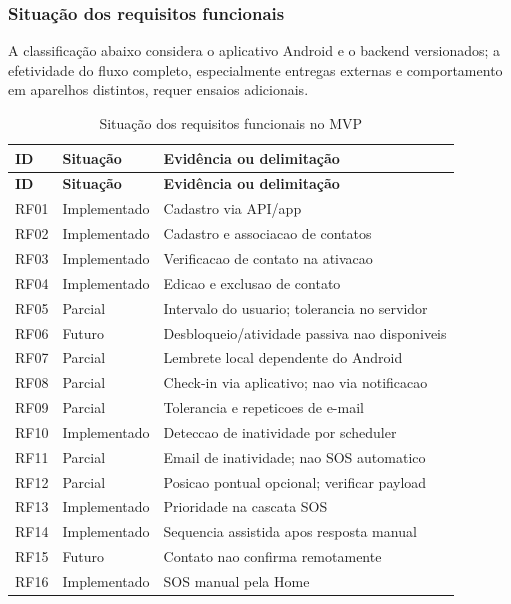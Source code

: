 \subsubsection{Situação dos requisitos funcionais}

A classificação abaixo considera o aplicativo Android e o backend versionados; a efetividade do fluxo completo, especialmente entregas externas e comportamento em aparelhos distintos, requer ensaios adicionais.

\begin{longtable}{p{1.25cm}p{2.2cm}p{10.0cm}}
\caption{Situação dos requisitos funcionais no MVP}\label{tab_status_rf}\\
\hline
\textbf{ID} & \textbf{Situação} & \textbf{Evidência ou delimitação} \\
\hline
\endfirsthead
\hline
\textbf{ID} & \textbf{Situação} & \textbf{Evidência ou delimitação} \\
\hline
\endhead
RF01 & Implementado & Cadastro via API/app \\
\hline
RF02 & Implementado & Cadastro e associacao de contatos \\
\hline
RF03 & Implementado & Verificacao de contato na ativacao \\
\hline
RF04 & Implementado & Edicao e exclusao de contato \\
\hline
RF05 & Parcial & Intervalo do usuario; tolerancia no servidor \\
\hline
RF06 & Futuro & Desbloqueio/atividade passiva nao disponiveis \\
\hline
RF07 & Parcial & Lembrete local dependente do Android \\
\hline
RF08 & Parcial & Check-in via aplicativo; nao via notificacao \\
\hline
RF09 & Parcial & Tolerancia e repeticoes de e-mail \\
\hline
RF10 & Implementado & Deteccao de inatividade por scheduler \\
\hline
RF11 & Parcial & Email de inatividade; nao SOS automatico \\
\hline
RF12 & Parcial & Posicao pontual opcional; verificar payload \\
\hline
RF13 & Implementado & Prioridade na cascata SOS \\
\hline
RF14 & Implementado & Sequencia assistida apos resposta manual \\
\hline
RF15 & Futuro & Contato nao confirma remotamente \\
\hline
RF16 & Implementado & SOS manual pela Home \\

\end{longtable}
